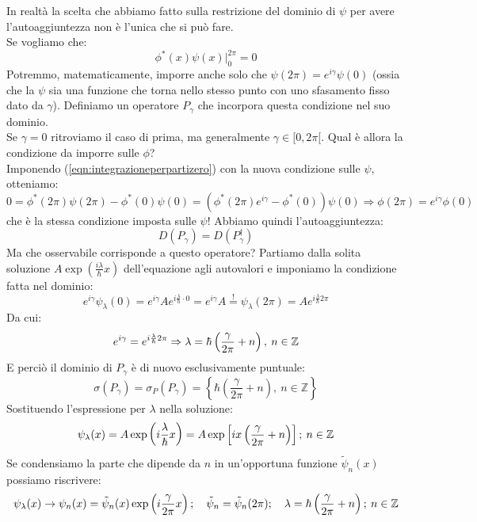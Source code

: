 \documentclass[../../FisicaTeorica.tex]{subfiles}
\begin{document}
In realtà la scelta che abbiamo fatto sulla restrizione del dominio di $\psi$ per avere l'autoaggiuntezza non è l'unica che si può fare.\\
Se vogliamo che:
\begin{equation}
\phi^\ast\left(x\right)\psi \left(x\right)\big|_0^{2\pi}=0
\label{eqn:integrazioneperpartizero}
\end{equation}
Potremmo, matematicamente, imporre anche solo che $\psi \left(2\pi\right)=e^{i\gamma}\psi \left(0\right)$ (ossia che la $\psi$ sia una funzione  che torna nello stesso punto con uno sfasamento fisso dato da $\gamma$). Definiamo un operatore $P_\gamma$ che incorpora questa condizione nel suo dominio.\\
Se $\gamma =0$ ritroviamo il caso di prima, ma generalmente $\gamma \in [0, 2\pi [$. Qual è allora la condizione da imporre sulle $\phi$?\\
Imponendo (\ref{eqn:integrazioneperpartizero}) con la nuova condizione sulle $\psi$, otteniamo:
\[
0= \phi^\ast\left(2\pi\right)\psi\left(2\pi\right)- \phi^\ast\left(0\right)\psi \left(0\right)=\left(\phi^\ast\left(2\pi\right)e^{i\gamma}-\phi^\ast\left(0\right)\right)\psi\left(0\right)\Rightarrow \phi\left(2\pi\right)=e^{i\gamma}\phi \left(0\right)
\]
che è la stessa condizione imposta sulle $\psi$! Abbiamo quindi l'autoaggiuntezza:
\[
D\left(P_\gamma\right)=D\left(P_\gamma^\dag\right)
\]
Ma che osservabile corrisponde a questo operatore? Partiamo dalla solita soluzione $A\exp\left(\frac{i\lambda}{\hbar}x\right)$ dell'equazione agli autovalori e imponiamo la condizione fatta nel dominio:
\[
e^{i\gamma}\psi_\lambda\left(0\right)=e^{i\gamma}A e^{i\frac{\lambda}{\hbar}\cdot 0}=e^{i\gamma}A\overset{!}{=}\psi_\lambda\left(2\pi\right)=A e^{i\frac{\lambda}{\hbar}2\pi}
\]
Da cui: 
\[
e^{i\gamma}=e^{i\frac{\lambda}{\hbar}2\pi}\Rightarrow \lambda = \hbar \left(\frac{\gamma}{2\pi} + n\right), \> n\in \mathbb{Z}
\]
E perciò il dominio di $P_\gamma$ è di nuovo esclusivamente puntuale:
\[
\sigma\left(P_\gamma\right)= \sigma_P\left(P_\gamma\right)= \left\{\hbar\left(\frac{\gamma}{2\pi}+n\right),\ n\in\mathbb{Z}\right\}
\]
Sostituendo l'espressione per $\lambda$ nella soluzione:
\[
\psi_\lambda(x) = A \exp\left(i\frac{\lambda}{\hbar}x\right) = A \exp\left [ix\left(\frac{\gamma}{2\pi}+n\right)\right ]; \> n\in\mathbb{Z}
\]
Se condensiamo la parte che dipende da $n$ in un'opportuna funzione $\tilde{\psi}_n(x)$ possiamo riscrivere:
\[
\psi_\lambda(x) \rightarrow \psi_n(x) = \tilde{\psi}_n(x) \exp\left(i\frac{\gamma}{2\pi}x\right); \quad \tilde{\psi}_n = \tilde{\psi}_n(2\pi); \quad \lambda = \hbar \left(\frac{\gamma}{2\pi} + n\right); \> n\in \mathbb{Z}
\]
\end{document}
